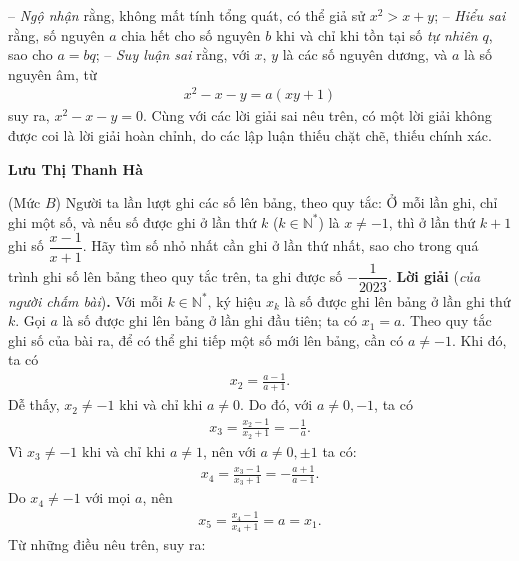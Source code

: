 \begin{multicols}{2}
	\vskip 0.05cm
	-- \textit{Ngộ nhận} rằng, không mất tính tổng quát, có thể giả sử $x^2 > x + y$;
	\vskip 0.05cm 
	-- \textit{Hiểu sai} rằng, số nguyên $a$ chia hết cho số nguyên $b$ khi và chỉ khi tồn tại số \textit{tự nhiên} $q$, sao cho $a = bq$;
	\vskip 0.05cm
	--\textit{ Suy luận sai} rằng, với $x$, $y$ là các số nguyên dương, và $a$ là số nguyên âm, từ
	\begin{align*}
		{x^2} - x - y = a\left( {xy + 1} \right)
	\end{align*}
	suy ra, $x^2 - x - y = 0$.
	\vskip 0.05cm  
	Cùng với các lời giải sai nêu trên, có một lời giải không được coi là lời giải hoàn chỉnh, do các lập luận thiếu chặt chẽ, thiếu chính xác.
	\begin{flushright}
		\textbf{\color{thachthuctoanhoc}Lưu Thị Thanh Hà}
	\end{flushright}
	{}
	(Mức $B$)
	Người ta lần lượt ghi các số lên bảng, theo quy tắc: Ở mỗi lần ghi, chỉ ghi một số, và nếu số được ghi ở lần thứ $k$ ($k \in \mathbb{N^*}$) là $x \ne -1$,  thì ở lần thứ $k + 1$ ghi số $\dfrac{x-1}{x+1}$. Hãy tìm số nhỏ nhất cần ghi ở lần thứ nhất, sao cho trong quá trình ghi số lên bảng theo quy tắc trên, ta ghi được số $-\dfrac{1}{2023}$.
	\vskip 0.05cm
	\textbf{\color{thachthuctoanhoc}Lời giải} (\textit{của người chấm bài})\textbf{\color{thachthuctoanhoc}.}
	\vskip 0.05cm
	Với mỗi $k \in \mathbb{N^*}$,  ký hiệu $x_k$  là số được ghi lên bảng ở lần ghi thứ $k$.
	\vskip 0.05cm
	Gọi $a$ là số được ghi lên bảng ở lần ghi đầu tiên; ta có $x_1 = a$.
	\vskip 0.05cm 
	Theo quy tắc ghi số của bài ra, để có thể ghi tiếp một số mới lên bảng, cần có $a \ne -1$.  Khi đó, ta có
	\begin{align*}
		{x_2} = \frac{{a - 1}}{{a + 1}}.
	\end{align*}
	Dễ thấy, $x_2 \ne -1$   khi và chỉ khi $a \ne 0$. Do đó, với $a \ne 0 ,-1$,   ta có
	\begin{align*}
		{x_3} = \frac{{{x_2} - 1}}{{{x_2} + 1}} =  - \frac{1}{a}.
	\end{align*}
	Vì $x_3 \ne -1$ khi và chỉ khi $a \ne 1$, nên với $a \ne 0, \pm 1$  ta có:
	\begin{align*}
		{x_4} = \frac{{{x_3} - 1}}{{{x_3} + 1}} =  - \frac{{a + 1}}{{a - 1}}.
	\end{align*}
	Do $x_4 \ne -1$ với mọi $a$, nên
	\begin{align*}
		{x_5} = \frac{{{x_4} - 1}}{{{x_4} + 1}} = a = {x_1}.
	\end{align*}
	Từ những điều nêu trên, suy ra:

\end{multicols}
